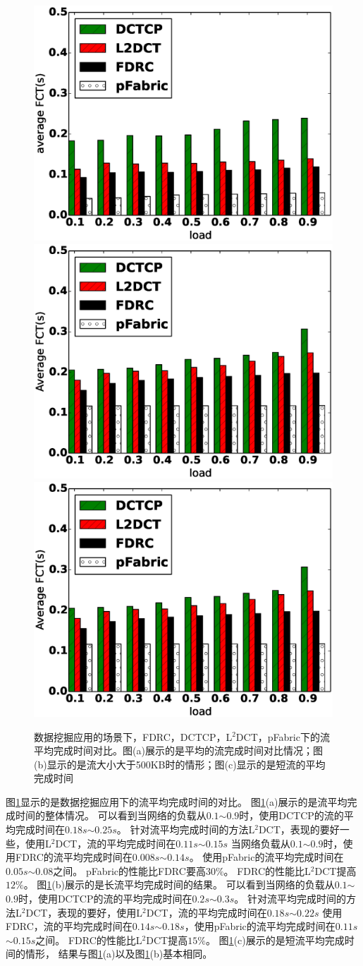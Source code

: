 \begin{figure}[h]
\centering
{}
 {\includegraphics[width=0.32\columnwidth]{figures/FDRC/evaluation/spineleaf/FCT_DATA_average.eps}}
{\includegraphics[width=0.32\columnwidth]{figures/FDRC/evaluation/spineleaf/FCT_DATA_large.eps}}
{\includegraphics[width=0.32\columnwidth]{figures/FDRC/evaluation/spineleaf/FCT_DATA_large.eps}}
\caption{数据挖掘应用的场景下，FDRC，DCTCP，L$^2$DCT，pFabric下的流平均完成时间对比。图(a)展示的是平均的流完成时间对比情况；图(b)显示的是流大小大于500KB时的情形；图(c)显示的是短流的平均完成时间}
\label{fdrc-fct-spine-data-5-fig}
\end{figure}


图\ref{fdrc-fct-spine-data-5-fig}显示的是数据挖掘应用下的流平均完成时间的对比。
图\ref{fdrc-fct-spine-data-5-fig}(a)展示的是流平均完成时间的整体情况。
可以看到当网络的负载从$0.1$$\sim$$0.9$时，使用DCTCP的流的平均完成时间在$0.18s$$\sim$$0.25s$。
针对流平均完成时间的方法L$^2$DCT，表现的要好一些，使用L$^2$DCT，流的平均完成时间在$0.11s$$\sim$$0.15s$
当网络负载从$0.1$$\sim$$0.9$时，使用FDRC的流平均完成时间在$0.008s$$\sim$$0.14s$。
使用pFabric的流平均完成时间在$0.05s$$\sim$$0.08$之间。
pFabric的性能比FDRC要高$30\%$。
FDRC的性能比L$^2$DCT提高$12\%$。
图\ref{fdrc-fct-spine-data-5-fig}(b)展示的是长流平均完成时间的结果。
可以看到当网络的负载从$0.1$$\sim$$0.9$时，使用DCTCP的流的平均完成时间在$0.2s$$\sim$$0.3s$。
针对流平均完成时间的方法L$^2$DCT，表现的要好，使用L$^2$DCT，流的平均完成时间在$0.18s$$\sim$$0.22s$
使用FDRC，流的平均完成时间在$0.14s$$\sim$$0.18s$，使用pFabric的流平均完成时间在$0.11s$$\sim$$0.15s$之间。
FDRC的性能比L$^2$DCT提高$15\%$。
图\ref{fdrc-fct-spine-data-5-fig}(c)展示的是短流平均完成时间的情形，
结果与图\ref{fdrc-fct-spine-data-5-fig}(a)以及图\ref{fdrc-fct-spine-data-5-fig}(b)基本相同。

